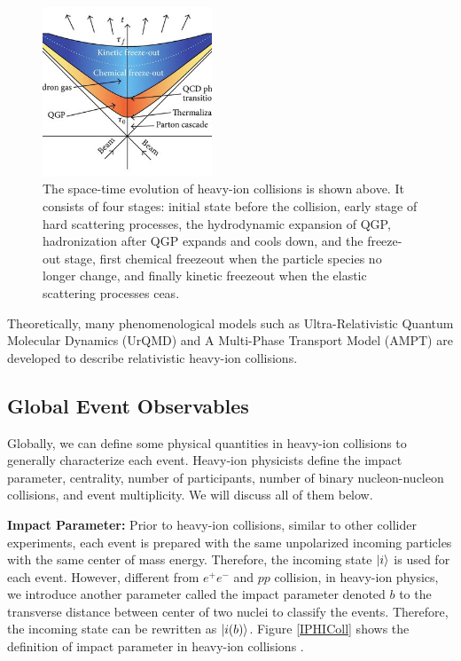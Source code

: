 \begin{figure}[hbtp]
\begin{center}
\includegraphics[width=0.45\textwidth]{Figures/Chapter1/HICSTEvolve.png}
\caption{The space-time evolution of heavy-ion collisions is shown above. It consists of four stages: initial state before the collision, early stage of hard scattering processes, the hydrodynamic expansion of QGP, hadronization after QGP expands and cools down, and the freeze-out stage, first chemical freezeout when the particle species no longer change, and finally kinetic freezeout when the elastic scattering processes ceas.}
\label{HICEvolution}
\end{center}
\end{figure} 

Theoretically, many phenomenological models such as Ultra-Relativistic Quantum Molecular Dynamics (UrQMD) and A Multi-Phase Transport Model (AMPT) are developed to describe relativistic heavy-ion collisions. 


\subsection{Global Event Observables}

Globally, we can define some physical quantities in heavy-ion collisions to generally characterize each event. Heavy-ion physicists define the impact parameter, centrality, number of participants, number of binary nucleon-nucleon collisions, and event multiplicity. We will discuss all of them below.

\textbf{Impact Parameter:} Prior to heavy-ion collisions, similar to other collider experiments, each event is prepared with the same unpolarized incoming particles with the same center of mass energy. Therefore, the incoming state $\ket{i}$ is used for each event. However, different from $e^+ e^-$ and $pp$ collision, in heavy-ion physics, we introduce another parameter called the impact parameter denoted $b$ to the transverse distance between center of two nuclei to classify the events. Therefore, the incoming state can be rewritten as  $\ket{i (b)}$. Figure \ref{IPHIColl} shows the definition of impact parameter in heavy-ion collisions \cite{IPHICText}.

